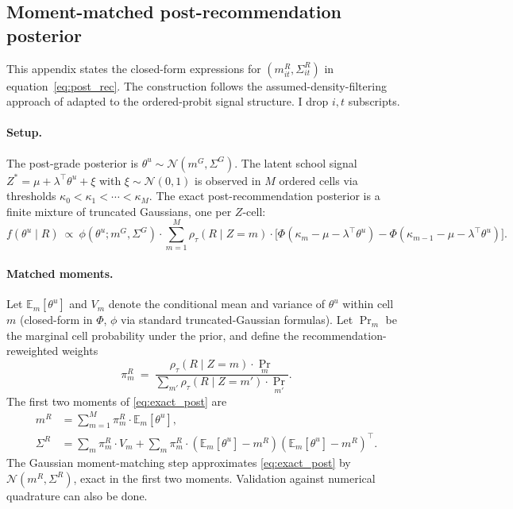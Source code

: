 \documentclass{article}
\begin{document}
\subsection{Moment-matched post-recommendation posterior}
\label{app:moment_match}

This appendix states the closed-form expressions for $(m^R_{it}, \Sigma^R_{it})$ 
in equation~\eqref{eq:post_rec}. The construction follows the assumed-density-filtering 
approach of \citet{minka2001expectation} adapted to the ordered-probit signal 
structure. I drop $i, t$ subscripts.

\paragraph{Setup.} The post-grade posterior is $\theta^u \sim \mathcal{N}(m^G, \Sigma^G)$. 
The latent school signal $Z^* = \mu + \lambda^\top \theta^u + \xi$ with 
$\xi \sim \mathcal{N}(0,1)$ is observed in $M$ ordered cells via thresholds 
$\kappa_0 < \kappa_1 < \cdots < \kappa_M$. The exact post-recommendation posterior 
is a finite mixture of truncated Gaussians, one per $Z$-cell:
\begin{equation}
  f(\theta^u \mid R) \ \propto\ \phi(\theta^u; m^G, \Sigma^G) \cdot 
  \sum_{m=1}^{M} \rho_\tau(R \mid Z=m) \cdot 
  \big[\Phi(\kappa_m - \mu - \lambda^\top \theta^u) - \Phi(\kappa_{m-1} - \mu - \lambda^\top \theta^u)\big].
  \label{eq:exact_post}
\end{equation}

\paragraph{Matched moments.} Let $\mathbb{E}_m[\theta^u]$ and $V_m$ denote the 
conditional mean and variance of $\theta^u$ within cell $m$ (closed-form in 
$\Phi$, $\phi$ via standard truncated-Gaussian formulas). Let $\Pr_m$ be the 
marginal cell probability under the prior, and define the recommendation-reweighted 
weights
\begin{equation}
  \pi^R_m \ =\ \frac{\rho_\tau(R \mid Z=m) \cdot \Pr_m}{\sum_{m'} \rho_\tau(R \mid Z=m') \cdot \Pr_{m'}}.
\end{equation}
The first two moments of \eqref{eq:exact_post} are
\begin{align}
  m^R &= \sum_{m=1}^M \pi^R_m \cdot \mathbb{E}_m[\theta^u], \label{eq:mR}\\
  \Sigma^R &= \sum_m \pi^R_m \cdot V_m + \sum_m \pi^R_m \cdot (\mathbb{E}_m[\theta^u] - m^R)(\mathbb{E}_m[\theta^u] - m^R)^\top. \label{eq:SR}
\end{align}
The Gaussian moment-matching step \citep{minka2001expectation, sarkka2013bayesian} 
approximates \eqref{eq:exact_post} by $\mathcal{N}(m^R, \Sigma^R)$, exact in the 
first two moments. Validation against numerical quadrature can also be done. 



\end{document}
